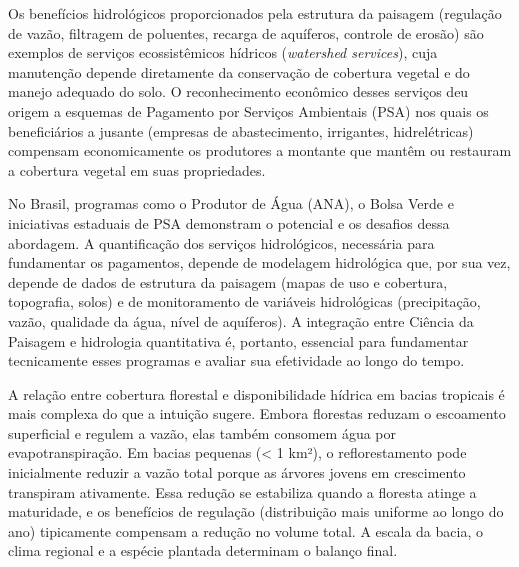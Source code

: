 \documentclass[
  portuguese,
  11pt,
  a4paper,
  open=any]{scrbook}
\begin{document}
Os benefícios hidrológicos proporcionados pela estrutura da paisagem
(regulação de vazão, filtragem de poluentes, recarga de aquíferos,
controle de erosão) são exemplos de serviços ecossistêmicos hídricos
(\emph{watershed services}), cuja manutenção depende diretamente da
conservação de cobertura vegetal e do manejo adequado do solo. O
reconhecimento econômico desses serviços deu origem a esquemas de
Pagamento por Serviços Ambientais (PSA) nos quais os beneficiários a
jusante (empresas de abastecimento, irrigantes, hidrelétricas) compensam
economicamente os produtores a montante que mantêm ou restauram a
cobertura vegetal em suas propriedades.

No Brasil, programas como o Produtor de Água (ANA), o Bolsa Verde e
iniciativas estaduais de PSA demonstram o potencial e os desafios dessa
abordagem. A quantificação dos serviços hidrológicos, necessária para
fundamentar os pagamentos, depende de modelagem hidrológica que, por sua
vez, depende de dados de estrutura da paisagem (mapas de uso e
cobertura, topografia, solos) e de monitoramento de variáveis
hidrológicas (precipitação, vazão, qualidade da água, nível de
aquíferos). A integração entre Ciência da Paisagem e hidrologia
quantitativa é, portanto, essencial para fundamentar tecnicamente esses
programas e avaliar sua efetividade ao longo do tempo.

\begin{tcolorbox}[enhanced jigsaw, colbacktitle=quarto-callout-tip-color!10!white, coltitle=black, opacityback=0, breakable, left=2mm, colback=white, bottomtitle=1mm, toptitle=1mm, titlerule=0mm, arc=.35mm, opacitybacktitle=0.6, leftrule=.75mm, colframe=quarto-callout-tip-color-frame, title=\textcolor{quarto-callout-tip-color}{\faLightbulb}\hspace{0.5em}{Para aprofundar}, rightrule=.15mm, bottomrule=.15mm, toprule=.15mm]

A relação entre cobertura florestal e disponibilidade hídrica em bacias
tropicais é mais complexa do que a intuição sugere. Embora florestas
reduzam o escoamento superficial e regulem a vazão, elas também consomem
água por evapotranspiração. Em bacias pequenas (\textless{} 1 km²), o
reflorestamento pode inicialmente reduzir a vazão total porque as
árvores jovens em crescimento transpiram ativamente. Essa redução se
estabiliza quando a floresta atinge a maturidade, e os benefícios de
regulação (distribuição mais uniforme ao longo do ano) tipicamente
compensam a redução no volume total. A escala da bacia, o clima regional
e a espécie plantada determinam o balanço final.

\end{tcolorbox}
\end{document}
